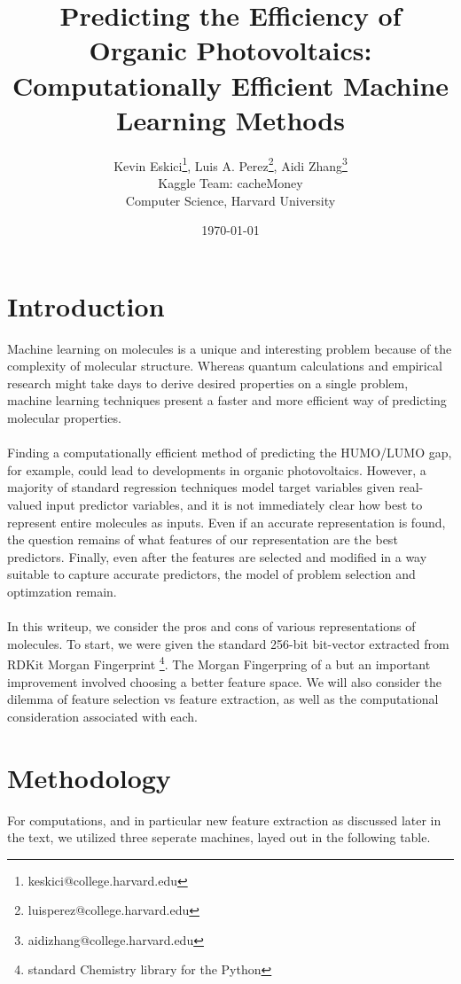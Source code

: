 \documentclass[letterpaper]{article}
\title{Predicting the Efficiency 
of Organic Photovoltaics: \\
Computationally Efficient Machine Learning Methods
}
\author{Kevin Eskici\thanks{keskici@college.harvard.edu}, Luis A. Perez\thanks{luisperez@college.harvard.edu}, Aidi Zhang\thanks{aidizhang@college.harvard.edu} \\
Kaggle Team: cacheMoney \\
Computer Science, Harvard University}
\date{\today}
\begin{document}
\maketitle

\begin{abstract}
\begin{quote}

\end{quote}
\end{abstract}

\section{Introduction}
Machine learning on molecules is a unique and interesting problem because of the complexity of molecular structure. Whereas quantum calculations and empirical research might take days to derive desired properties on a single problem, machine learning techniques present a faster and more efficient way of predicting molecular properties.\\
\\
Finding a computationally efficient method of predicting the HUMO/LUMO gap, for example, could lead to developments in organic photovoltaics. However, a majority of standard regression techniques model target variables given real-valued input predictor variables, and it is not immediately clear how best to represent entire molecules as inputs. Even if an accurate representation is found, the question remains of what features of our representation are the best predictors. Finally, even after the features are selected and modified in a way suitable to capture accurate predictors, the model of problem selection and optimzation remain.\\
\\
In this writeup, we consider the pros and cons of various representations of molecules. To start, we were given the standard 256-bit bit-vector extracted from RDKit Morgan Fingerprint \footnote{standard Chemistry library for the Python}. The Morgan Fingerpring of a  but an important improvement involved choosing a better feature space. We will also consider the dilemma of feature selection vs feature extraction, as well as the computational consideration associated with each.

\section{Methodology}
 For computations, and in particular new feature extraction as discussed later in the text, we utilized three seperate machines, layed out in the following table.
 
\end{document}
